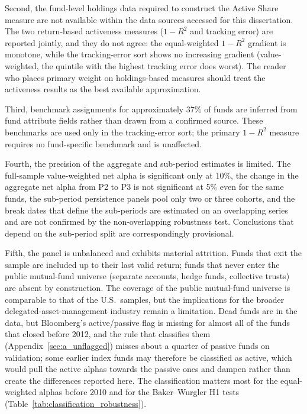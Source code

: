 \documentclass[12pt, oneside]{report}
\begin{document}
Second, the fund-level holdings data required to construct the
\textcite{CremersPetajisto2009} Active Share measure are not available
within the data sources accessed for this dissertation. The two
return-based activeness measures ($1-R^2$ and tracking error) are
reported jointly, and they do not agree: the equal-weighted $1-R^2$
gradient is monotone, while the tracking-error sort shows no increasing
gradient (value-weighted, the quintile with the highest tracking error
does worst). The reader who
places primary weight on holdings-based measures should treat the
activeness results as the best available approximation.

Third, benchmark assignments for approximately 37\% of funds are inferred
from fund attribute fields rather than drawn from a confirmed source.
These benchmarks are used only in the tracking-error sort; the primary
$1-R^2$ measure requires no fund-specific benchmark and is unaffected.

Fourth, the precision of the aggregate and sub-period estimates is
limited. The full-sample value-weighted net alpha is significant only at
10\%, the change in the aggregate net alpha from P2 to P3 is not
significant at 5\% even for the same funds, the sub-period persistence
panels pool only two or three cohorts, and the break dates that define
the sub-periods are estimated on an overlapping series and are not
confirmed by the non-overlapping robustness test. Conclusions that depend
on the sub-period split are correspondingly provisional.

Fifth, the panel is unbalanced and exhibits material attrition. Funds
that exit the sample are included up to their last valid return; funds
that never enter the public mutual-fund universe (separate accounts,
hedge funds, collective trusts) are absent by construction. The coverage
of the public mutual-fund universe is comparable to that of the
\textcite{FamaFrench2010,BarrasScailletWermers2010} U.S.\ samples, but the
implications for the broader delegated-asset-management industry remain
a limitation. Dead funds are in the data, but Bloomberg's active/passive
flag is missing for almost all of the funds that closed before 2012, and
the rule that classifies them (Appendix~\ref{sec:a_unflagged}) misses
about a quarter of passive funds on validation; some earlier index funds
may therefore be classified as active, which would pull the active alphas
towards the passive ones and dampen rather than create the differences
reported here. The classification matters most for the equal-weighted
alphas before 2010 and for the Baker--Wurgler H1 tests
(Table~\ref{tab:classification_robustness}).
\end{document}
